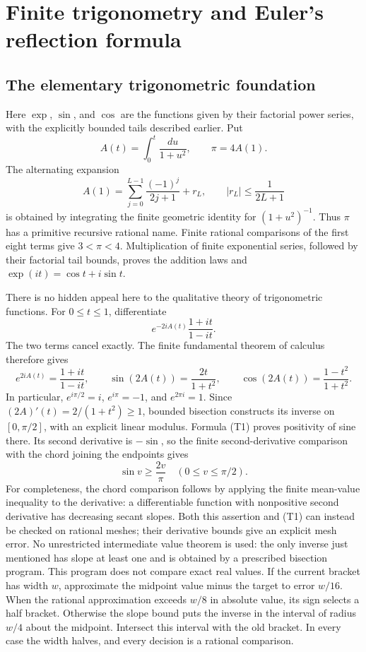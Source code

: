 
\section{Finite trigonometry and Euler's reflection formula}

\subsection{The elementary trigonometric foundation}

Here \(\exp\), \(\sin\), and \(\cos\) are the functions given by their
factorial power series, with the explicitly bounded tails described earlier.
Put
\[
 A(t)=\int_0^t\frac{du}{1+u^2},\qquad \pi=4A(1).
\]
The alternating expansion
\[
 A(1)=\sum_{j=0}^{L-1}\frac{(-1)^j}{2j+1}+r_L,
 \qquad |r_L|\le\frac1{2L+1}
\]
is obtained by integrating the finite geometric identity for
\((1+u^2)^{-1}\). Thus \(\pi\) has a primitive recursive rational name.
Finite rational comparisons of the first eight terms give \(3<\pi<4\).
Multiplication of finite exponential series, followed by their factorial
tail bounds, proves the addition laws and
\(\exp(it)=\cos t+i\sin t\).

There is no hidden appeal here to the qualitative theory of trigonometric
functions. For \(0\le t\le1\), differentiate
\[
 e^{-2iA(t)}\frac{1+it}{1-it}.
\]
The two terms cancel exactly. The finite fundamental theorem of calculus
therefore gives
\[
 e^{2iA(t)}=\frac{1+it}{1-it},\qquad
 \sin(2A(t))=\frac{2t}{1+t^2},\qquad
 \cos(2A(t))=\frac{1-t^2}{1+t^2}.                 \tag{T1}
\]
In particular, \(e^{i\pi/2}=i\), \(e^{i\pi}=-1\), and
\(e^{2\pi i}=1\). Since \((2A)'(t)=2/(1+t^2)\ge1\), bounded
bisection constructs its inverse on \([0,\pi/2]\), with an explicit
linear modulus. Formula (T1) proves positivity of sine there. Its second
derivative is \(-\sin\), so the finite second-derivative comparison with
the chord joining the endpoints gives
\[
 \sin v\ge\frac{2v}{\pi}\quad(0\le v\le\pi/2).
                                                        \tag{T2}
\]
For completeness, the chord comparison follows by applying the finite
mean-value inequality to the derivative: a differentiable function with
nonpositive second derivative has decreasing secant slopes. Both this
assertion and (T1) can instead be checked on rational meshes; their
derivative bounds give an explicit mesh error. No unrestricted intermediate
value theorem is used: the only inverse just mentioned has slope at least
one and is obtained by a prescribed bisection program. This program does
not compare exact real values. If the current bracket has width \(w\),
approximate the midpoint value minus the target to error \(w/16\).
When the rational approximation exceeds \(w/8\) in absolute value,
its sign selects a half bracket. Otherwise the slope bound puts the
inverse in the interval of radius \(w/4\) about the midpoint. Intersect
this interval with the old bracket. In every case the width halves, and
every decision is a rational comparison.

